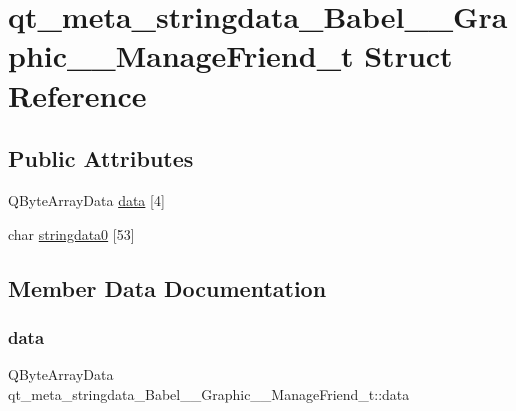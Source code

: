 \hypertarget{structqt__meta__stringdata__Babel____Graphic____ManageFriend__t}{}\section{qt\+\_\+meta\+\_\+stringdata\+\_\+\+Babel\+\_\+\+\_\+\+Graphic\+\_\+\+\_\+\+Manage\+Friend\+\_\+t Struct Reference}
\label{structqt__meta__stringdata__Babel____Graphic____ManageFriend__t}
\subsection*{Public Attributes}
\begin{DoxyCompactItemize}
\item 
Q\+Byte\+Array\+Data \hyperlink{structqt__meta__stringdata__Babel____Graphic____ManageFriend__t_ae87c9e97fe83c3808f28e28106c62edd}{data} \mbox{[}4\mbox{]}
\item 
char \hyperlink{structqt__meta__stringdata__Babel____Graphic____ManageFriend__t_adf9f3efa09bae2786bb0fc8097b690a2}{stringdata0} \mbox{[}53\mbox{]}
\end{DoxyCompactItemize}


\subsection{Member Data Documentation}
\mbox{\label{structqt__meta__stringdata__Babel____Graphic____ManageFriend__t_ae87c9e97fe83c3808f28e28106c62edd}} 
\subsubsection{\texorpdfstring{data}{data}}
{\footnotesize\ttfamily Q\+Byte\+Array\+Data qt\+\_\+meta\+\_\+stringdata\+\_\+\+Babel\+\_\+\+\_\+\+Graphic\+\_\+\+\_\+\+Manage\+Friend\+\_\+t\+::data}

